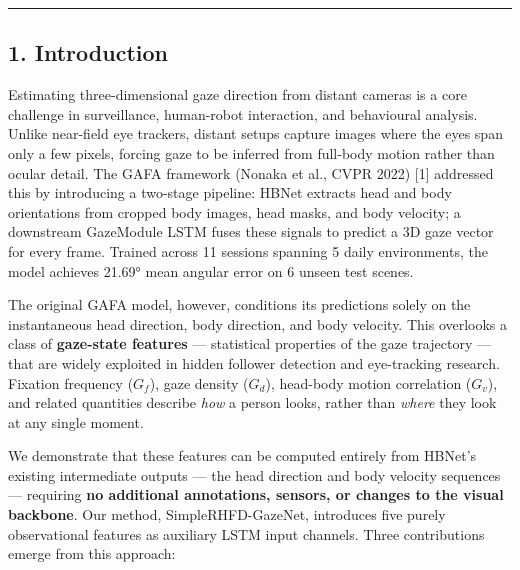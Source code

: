 \documentclass[
]{article}
\begin{document}
\begin{center}\rule{0.5\linewidth}{0.5pt}\end{center}

\hypertarget{introduction}{%
\subsection{1. Introduction}\label{introduction}}

Estimating three-dimensional gaze direction from distant cameras is a
core challenge in surveillance, human-robot interaction, and behavioural
analysis. Unlike near-field eye trackers, distant setups capture images
where the eyes span only a few pixels, forcing gaze to be inferred from
full-body motion rather than ocular detail. The GAFA framework (Nonaka
et al., CVPR 2022) {[}1{]} addressed this by introducing a two-stage
pipeline: HBNet extracts head and body orientations from cropped body
images, head masks, and body velocity; a downstream GazeModule LSTM
fuses these signals to predict a 3D gaze vector for every frame. Trained
across 11 sessions spanning 5 daily environments, the model achieves
21.69° mean angular error on 6 unseen test scenes.

The original GAFA model, however, conditions its predictions solely on
the instantaneous head direction, body direction, and body velocity.
This overlooks a class of \textbf{gaze-state features} --- statistical
properties of the gaze trajectory --- that are widely exploited in
hidden follower detection and eye-tracking research. Fixation frequency
(\(G_f\)), gaze density (\(G_d\)), head-body motion correlation
(\(G_v\)), and related quantities describe \emph{how} a person looks,
rather than \emph{where} they look at any single moment.

We demonstrate that these features can be computed entirely from HBNet's
existing intermediate outputs --- the head direction and body velocity
sequences --- requiring \textbf{no additional annotations, sensors, or
changes to the visual backbone}. Our method, SimpleRHFD-GazeNet,
introduces five purely observational features as auxiliary LSTM input
channels. Three contributions emerge from this approach:
\end{document}
